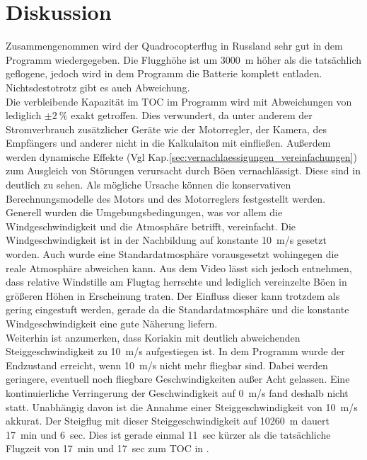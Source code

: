 \section{Diskussion}
\label{sec:nachbildung_diskussion}

Zusammengenommen wird der Quadrocopterflug in Russland sehr gut in dem Programm wiedergegeben. Die Flugghöhe ist um \SI{3000}{m} höher als die tatsächlich geflogene, jedoch wird in dem Programm die Batterie komplett entladen. Nichtsdestotrotz gibt es auch Abweichung.\\
Die verbleibende Kapazität im TOC im Programm wird mit Abweichungen von lediglich \ensuremath{\pm\SI{2}{\%}} exakt getroffen. Dies verwundert, da unter anderem der Stromverbrauch zusätzlicher Geräte wie der Motorregler, der Kamera, des Empfängers und anderer nicht in die Kalkulaiton mit einfließen. Außerdem werden dynamische Effekte (Vgl Kap.\ref{sec:vernachlaessigungen_vereinfachungen}) zum Ausgleich von Störungen verursacht durch Böen vernachlässigt. Diese sind in \cite{Anderson.2018} deutlich zu sehen. Als mögliche Ursache können die konservativen Berechnungsmodelle des Motors und des Motorreglers festgestellt werden. Generell wurden die Umgebungsbedingungen, was vor allem die Windgeschwindigkeit und die Atmosphäre betrifft, vereinfacht. Die Windgeschwindigkeit ist in der Nachbildung auf konstante \SI{10}{m/s} gesetzt worden. Auch wurde eine Standardatmosphäre vorausgesetzt wohingegen die reale Atmosphäre abweichen kann. Aus dem Video lässt sich jedoch entnehmen, dass relative Windstille am Flugtag herrschte und lediglich vereinzelte Böen in größeren Höhen in Erscheinung traten. Der Einfluss dieser kann trotzdem als gering eingestuft werden, gerade da die Standardatmosphäre und die konstante Windgeschwindigkeit eine gute Näherung liefern. \\
Weiterhin ist anzumerken, dass Koriakin mit deutlich abweichenden Steiggeschwindigkeit zu \SI{10}{m/s} aufgestiegen ist. In dem Programm wurde der Endzustand erreicht, wenn \SI{10}{m/s} nicht mehr fliegbar sind. Dabei werden geringere, eventuell noch fliegbare Geschwindigkeiten außer Acht gelassen. Eine kontinuierliche Verringerung der Geschwindigkeit auf \SI{0}{m/s} fand deshalb nicht statt. Unabhängig davon ist die Annahme einer Steiggeschwindigkeit von \SI{10}{m/s} akkurat. Der Steigflug mit dieser Steiggeschwindigkeit auf \SI{10260}{m} dauert \SI{17}{min} und \SI{6}{sec}. Dies ist gerade einmal \SI{11}{sec} kürzer als die tatsächliche Flugzeit von \SI{17}{min} und \SI{17}{sec} zum TOC in \cite{Anderson.2018}.\\
